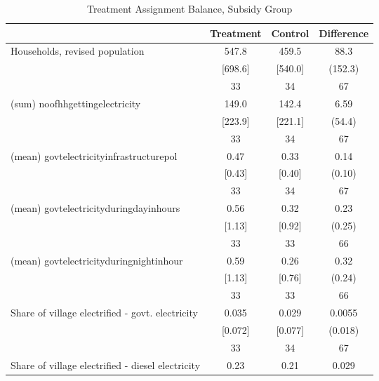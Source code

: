 \begin{table}[htbp]\centering
\def\sym#1{\ifmmode^{#1}\else\(^{#1}\)\fi}
\caption{Treatment Assignment Balance, Subsidy Group \label{tab:"balance"}}
\begin{tabular*}{0.9\hsize}{@{\hskip\tabcolsep\extracolsep\fill}l*{1}{ccc}}
\toprule
                                &Treatment&  Control&Difference         \\
\midrule
Households, revised population  &    547.8&    459.5&     88.3         \\
                                &  [698.6]&  [540.0]&  (152.3)         \\
                                &       33&       34&       67         \\
(sum) noofhhgettingelectricity  &    149.0&    142.4&     6.59         \\
                                &  [223.9]&  [221.1]&   (54.4)         \\
                                &       33&       34&       67         \\
(mean) govtelectricityinfrastructurepol&     0.47&     0.33&     0.14         \\
                                &   [0.43]&   [0.40]&   (0.10)         \\
                                &       33&       34&       67         \\
(mean) govtelectricityduringdayinhours&     0.56&     0.32&     0.23         \\
                                &   [1.13]&   [0.92]&   (0.25)         \\
                                &       33&       33&       66         \\
(mean) govtelectricityduringnightinhour&     0.59&     0.26&     0.32         \\
                                &   [1.13]&   [0.76]&   (0.24)         \\
                                &       33&       33&       66         \\
Share of village electrified - govt. electricity&    0.035&    0.029&   0.0055         \\
                                &  [0.072]&  [0.077]&  (0.018)         \\
                                &       33&       34&       67         \\
Share of village electrified - diesel electricity&     0.23&     0.21&    0.029         \\

\end{tabular*}
\end{table}
